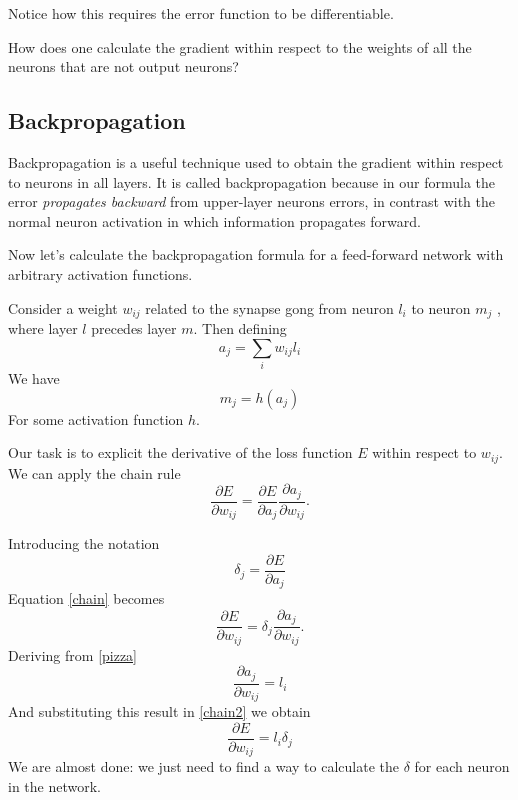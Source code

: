 \documentclass[a4paper]{report}
\begin{document}
Notice how this requires the error function to be differentiable.

How does one calculate the gradient within respect to the weights of all the neurons that are not output neurons?

\subsection{Backpropagation}
Backpropagation is a useful technique used to obtain the gradient within respect to neurons in all layers.
It is called backpropagation because in our formula the error \textit{propagates backward} from upper-layer neurons errors, in contrast with the normal neuron activation in which information propagates forward.

Now let's calculate the backpropagation formula for a feed-forward network with arbitrary activation functions.

Consider a weight $w_{ij}$ related to the synapse gong from neuron $l_i$ to neuron $m_j$ , where layer $l$ precedes layer $m$.
Then defining
\begin{equation}
a_j = \sum_i w_{ij}l_i
\label{pizza}
\end{equation}
We have
\begin{equation}
m_j = h(a_j)
\label{pizza2}
\end{equation}
For some activation function $h$.

Our task is to explicit the derivative of the loss function $E$ within respect to $w_{ij}$.
We can apply the chain rule
\begin{equation}
\frac{\partial E}{\partial w_{ij}}=\frac{\partial E}{\partial a_j} \frac{\partial a_j}{\partial w_{ij}}.
\label{chain}
\end{equation}

Introducing the notation
\begin{equation}
    \delta_j = \frac{\partial E}{\partial a_j}
    \label{delta}
\end{equation}
Equation \ref{chain} becomes
\begin{equation}
	\frac{\partial E}{\partial w_{ij}} = \delta_j \frac{\partial a_j}{\partial w_{ij}}.
	\label{chain2}
\end{equation}
Deriving from \ref{pizza}
\begin{equation}
\frac{\partial a_j}{\partial w_{ij}} = l_i
\end{equation}
And substituting this result in \ref{chain2} we obtain
\begin{equation}
\frac{\partial E}{\partial w_{ij}}= l_i \delta_j
\end{equation}
We are almost done:
we just need to find a way to calculate the $\delta$ for each neuron in the network.
\end{document}
